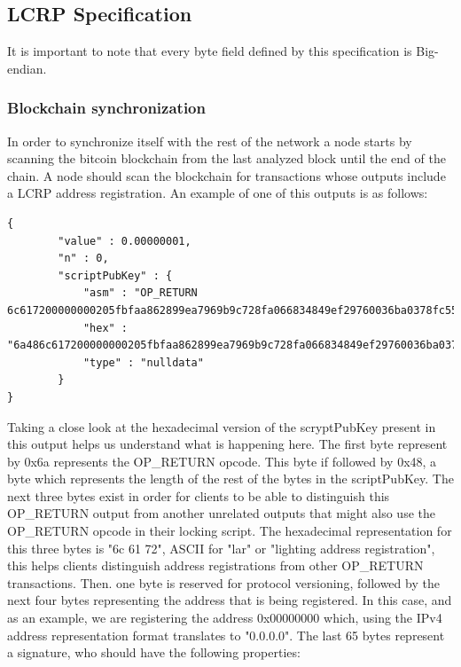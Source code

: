 \subsection{LCRP Specification}
\label{ssec:protocol_specification}

It is important to note that every byte field defined by this specification is Big-endian.

\subsubsection{Blockchain synchronization}
\label{sssec:blockchain_sync}

In order to synchronize itself with the rest of the network a node starts by scanning the bitcoin blockchain from the last analyzed block until the end of the chain. A node should scan the blockchain for transactions whose outputs include a LCRP address registration. An example of one of this outputs is as follows:

\begin{verbatim}
{
        "value" : 0.00000001,
        "n" : 0,
        "scriptPubKey" : {
            "asm" : "OP_RETURN 6c617200000000205fbfaa862899ea7969b9c728fa066834849ef29760036ba0378fc557d6bc17847f24784fc767cc1abd439567bb2d95fb4f4cbc7bc9bbee7430020725a2c5e523",
            "hex" : "6a486c617200000000205fbfaa862899ea7969b9c728fa066834849ef29760036ba0378fc557d6bc17847f24784fc767cc1abd439567bb2d95fb4f4cbc7bc9bbee7430020725a2c5e523",
            "type" : "nulldata"
        }
}
\end{verbatim} 

Taking a close look at the hexadecimal version of the scryptPubKey present in this output helps us understand what is happening here. The first byte represent by 0x6a represents the OP\_RETURN opcode. This byte if followed by 0x48, a byte which represents the length of the rest of the bytes in the scriptPubKey. The  next three bytes exist in order for clients to be able to distinguish this OP\_RETURN output from another unrelated outputs that might also use the OP\_RETURN opcode in their locking script. The hexadecimal representation for this three bytes is "6c 61 72", ASCII for "lar" or "lighting address registration", this helps clients distinguish address registrations from other OP\_RETURN transactions. Then. one byte is reserved for protocol versioning, followed by the next four bytes representing the address that is being registered. In this case, and as an example, we are registering the address 0x00000000 which, using the IPv4 address representation format translates to "0.0.0.0". The last 65 bytes represent a signature, who should have the following properties:

